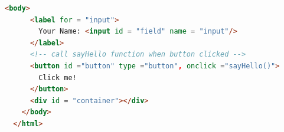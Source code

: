 \documentclass[12pt]{report}
\begin{document}
\begin{enumerate}
\begin{lstlisting}[language = html, breaklines = true]
    <body>
      <label for = "input">
        Your Name: <input id = "field" name = "input"/>
      </label>
      <!-- call sayHello function when button clicked -->
      <button id ="button" type ="button", onclick ="sayHello()">
        Click me!
      </button>
      <div id = "container"></div>
    </body>
  </html>
\end{lstlisting}
%
%
\end{enumerate}
\end{document}

